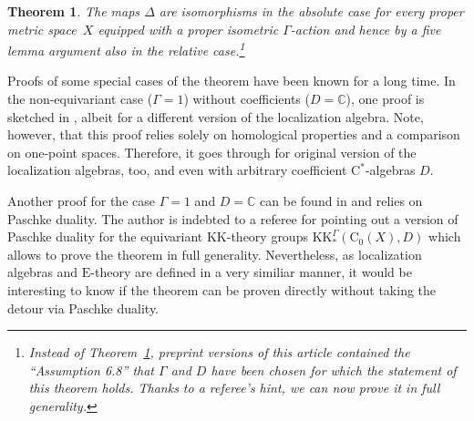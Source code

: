 \documentclass[pdftex]{sigma}
\numberwithin{equation}{section}
\newtheorem{thm}{Theorem}[section]
\theoremstyle{definition}
\newcommand{\C}{\mathbb{C}}
\newcommand{\Ct}{\mathrm{C}}
\newcommand{\Cz}{\Ct_0}
\newcommand{\KK}{\mathrm{KK}}
\newcommand{\EE}{\mathrm{E}}
\newcommand{\textCstar}{\ensuremath{\mathrm{C}^*\!}}
\begin{document}
\begin{thm}\label{thm:Khomologydefinitions}
The maps $\Delta$ are isomorphisms in the absolute case for every proper metric space~$X$ equipped with a proper isometric $\Gamma$-action and hence by a five lemma argument also in the relative case.\footnote{Instead of Theorem~\ref{thm:Khomologydefinitions}, preprint versions of this article contained the ``Assumption 6.8'' that $\Gamma$ and $D$ have been chosen for which the statement of this theorem holds. Thanks to a referee's hint, we can now prove it in full generality.}
\end{thm}

Proofs of some special cases of the theorem have been known for a long time.
In the non-equivariant case ($\Gamma=1$) without coefficients ($D=\C$), one proof is sketched in \cite[Construction~6.7.5, Exercises~B.3.2 and~B.3.3]{WillettYuHigherIndexTheory}, albeit for a different version of the localization algebra. Note, however, that this proof relies solely on homological properties and a comparison on one-point spaces. Therefore, it goes through for original version of the localization algebras, too, and even with arbitrary coefficient \textCstar-algebras $D$.

Another proof for the case $\Gamma=1$ and $D=\C$ can be found in \cite[Proposition~4.3]{QiaoRoe} and relies on Paschke duality. The author is indebted to a referee for pointing out a version of Paschke duality for the equivariant $\KK$-theory groups $\KK^\Gamma_*(\Cz(X),D)$ which allows to prove the theorem in full generality.
Nevertheless, as localization algebras and $\EE$-theory are defined in a very similiar manner, it would be interesting to know if the theorem can be proven directly without taking the detour via Paschke duality.
\end{document}
